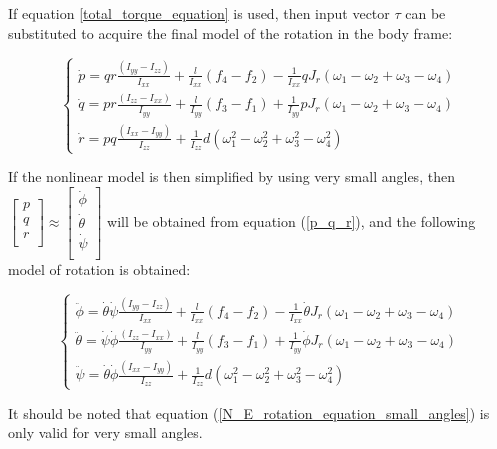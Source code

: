 \documentclass{thesisreport}
\begin{document}
If equation \ref{total_torque_equation} is used, then input vector $\tau$ can be substituted to acquire the final model of the rotation in the body frame:

\begin{equation}
\begin{cases}
\dot{p} = qr \frac{(I_{yy}-I_{zz})}{I_{xx}} + \frac{l}{I_{xx}}(f_4-f_2) - \frac{1}{I_{xx}}qJ_r (\omega_1 - \omega_2 + \omega_3 - \omega_4) \\
\dot{q} = pr \frac{(I_{zz}-I_{xx})}{I_{yy}} + \frac{l}{I_{yy}}(f_3-f_1) + \frac{1}{I_{yy}}pJ_r (\omega_1 - \omega_2 + \omega_3 - \omega_4) \\
\dot{r} = pq \frac{(I_{xx}-I_{yy})}{I_{zz}} + \frac{1}{I_{zz}} d (\omega_1^2 -\omega_2^2 + \omega_3^2 - \omega_4^2)
\end{cases}
\end{equation}

If the nonlinear model is then simplified by using very small angles, then $\begin{bmatrix}
p \\ 
q \\
r \\ 
\end{bmatrix} \approx \begin{bmatrix}
\dot{\phi} \\
\dot{\theta} \\
\dot{\psi} \\
\end{bmatrix}$ will be obtained from equation (\ref{p_q_r}), and the following model of rotation is obtained:

\begin{equation}\label{N_E_rotation_equation_small_angles}
\begin{cases}
\ddot{\phi} = \dot{\theta} \dot{\psi} \frac{(I_{yy}-I_{zz})}{I_{xx}} + \frac{l}{I_{xx}}(f_4-f_2) - \frac{1}{I_{xx}} \dot{\theta} J_r (\omega_1 - \omega_2 + \omega_3 - \omega_4) \\
\ddot{\theta} = \dot{\psi} \dot{\phi} \frac{(I_{zz}-I_{xx})}{I_{yy}} + \frac{l}{I_{yy}}(f_3-f_1) + \frac{1}{I_{yy}} \dot{\phi} J_r (\omega_1 - \omega_2 + \omega_3 - \omega_4) \\
\ddot{\psi} = \dot{\theta} \dot{\phi} \frac{(I_{xx}-I_{yy})}{I_{zz}} + \frac{1}{I_{zz}} d (\omega_1^2 -\omega_2^2 + \omega_3^2 - \omega_4^2)
\end{cases}
\end{equation}

It should be noted that equation (\ref{N_E_rotation_equation_small_angles}) is only valid for very small angles.
\end{document}
